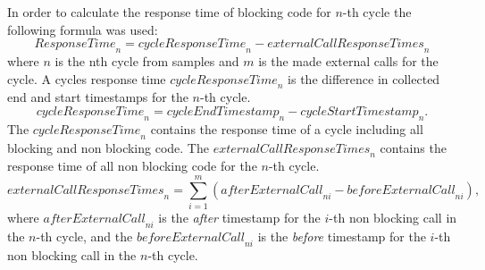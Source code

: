 In order to calculate the response time of blocking code for $n$-th cycle the following formula was used:
\[
\textit{ResponseTime}_n
=\textit{cycleResponseTime}_n - \textit{externalCallResponseTimes}_n
\]
where $n$ is the nth cycle from samples and $m$ is the made external calls for the cycle.
A cycles response time $\textit{cycleResponseTime}_n$ is the difference in collected end and start timestamps for the $n$-th cycle.
\[
\textit{cycleResponseTime}_n=\textit{cycleEndTimestamp}_n - \textit{cycleStartTimestamp}_n
.\]
The $\textit{cycleResponseTime}_n$ contains the response time of a cycle including all blocking and non blocking code.
The $\textit{externalCallResponseTimes}_n$ contains the response time of all non blocking code for the $n$-th cycle.
\[
\textit{externalCallResponseTimes}_n = \sum_{i=1}^{\textit{m}} (\textit{afterExternalCall}_{ni} -     \textit{beforeExternalCall}_{ni})
,\] where $\textit{afterExternalCall}_{ni}$ is the \textit{after} timestamp for the $i$-th non blocking call in the $n$-th cycle, and the $\textit{beforeExternalCall}_{ni}$ is the \textit{before} timestamp for the $i$-th non blocking call in the $n$-th cycle.


